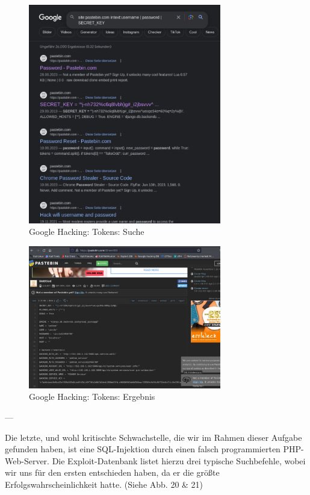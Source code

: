 \documentclass{article}
\begin{document}
\begin{figure}[H]
	\includegraphics[width=0.75\textwidth]{images/18}
	\centering
	\caption{Google Hacking: Tokens: Suche}
\end{figure}


\begin{figure}[H]
	\includegraphics[width=0.75\textwidth]{images/19}
	\centering
	\caption{Google Hacking: Tokens: Ergebnis}
\end{figure}

---

Die letzte, und wohl kritischte Schwachstelle, die wir im Rahmen dieser Aufgabe gefunden 
haben, ist eine SQL-Injektion durch einen falsch programmierten PHP-Web-Server. Die Exploit-Datenbank
listet hierzu drei typische Suchbefehle, wobei wir uns für den ersten entschieden haben, da er
die größte Erfolgswahrscheinlichkeit hatte. (Siehe Abb. 20 \& 21)
\end{document}
